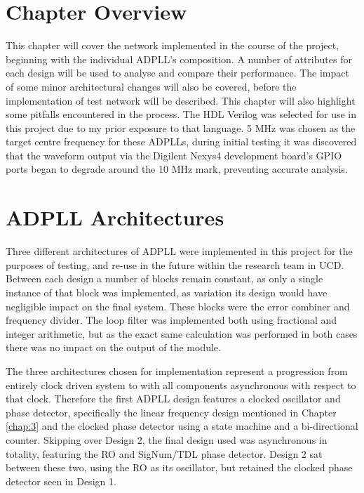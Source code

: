 \section{Chapter Overview}
This chapter will cover the network implemented in the course of the project, beginning with the individual \ac{ADPLL}'s composition. A number of attributes for each design will be used to analyse and compare their performance. The impact of some minor architectural changes will also be covered, before the implementation of test network will be described. This chapter will also highlight some pitfalls encountered in the process. The \ac{HDL} Verilog was selected for use in this project due to my prior exposure to that language. 5 MHz was chosen as the target centre frequency for these \acp{ADPLL}, during initial testing it was discovered that the waveform output via the Digilent Nexys4 development board's \ac{GPIO} ports began to degrade around the 10 MHz mark, preventing accurate analysis.

\section{\acs{ADPLL} Architectures}
Three different architectures of \ac{ADPLL} were implemented in this project for the purposes of testing, and re-use in the future within the research team in \acl{UCD}. Between each design a number of blocks remain constant, as only a single instance of that block was implemented, as variation its design would have negligible impact on the final system. These blocks were the error combiner and frequency divider. The loop filter was implemented both using fractional and integer arithmetic, but as the exact same calculation was performed in both cases there was no impact on the output of the module.

The three architectures chosen for implementation represent a progression from entirely  clock driven system to  with all components asynchronous with respect to that clock. Therefore the first \ac{ADPLL} design features a clocked oscillator and phase detector, specifically the linear frequency design mentioned in Chapter \ref{chap:3} and the clocked phase detector using a state machine and a bi-directional counter. Skipping over Design 2, the final design used was asynchronous in totality, featuring the \acl{RO} and SigNum/\ac{TDL} phase detector. Design 2 sat between these two, using the \ac{RO} as its oscillator, but retained the clocked phase detector seen in Design 1.

